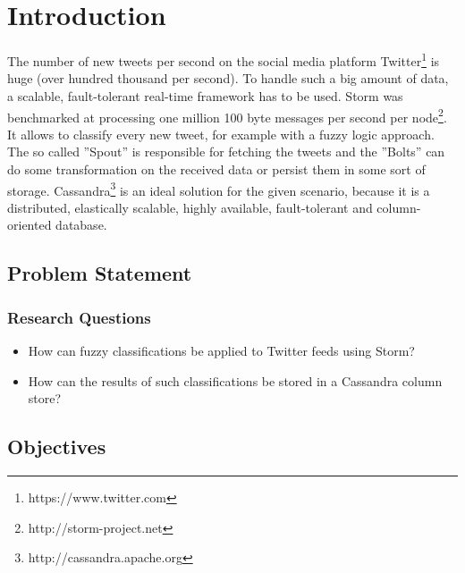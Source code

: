 \documentclass[a4paper]{article}
\begin{document}
  





\pagestyle{plain}
\newpage

\tableofcontents
\newpage

\section{Introduction}

The number of new tweets per second on the social media platform Twitter\footnote{https://www.twitter.com} is huge (over hundred thousand per second). To handle such a big amount of data, a scalable, fault-tolerant real-time framework has to be used. Storm was benchmarked at processing one million 100 byte messages per second per node\footnote{http://storm-project.net}. It allows to classify every new tweet, for example with a fuzzy logic approach. The so called ''Spout'' is responsible for fetching the tweets and the ''Bolts'' can do some transformation on the received data or persist them in some sort of storage. Cassandra\footnote{http://cassandra.apache.org} is an ideal solution for the given scenario, because it is a distributed, elastically scalable, highly available, fault-tolerant and column-oriented database.

\subsection{Problem Statement}

\subsubsection{Research Questions}\label{research_questions}
\vspace{0.5cm}
\begin{itemize}
\item How can fuzzy classifications be applied to Twitter feeds using Storm?
\item How can the results of such classifications be stored in a Cassandra column store?
\end{itemize}



\subsection{Objectives}
\end{document}
